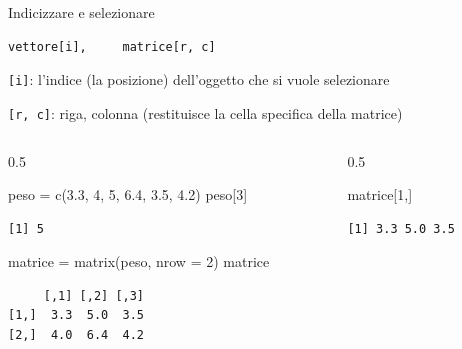 \documentclass[
  ignorenonframetext,
  compress, aspectratio=149]{beamer}
\newenvironment{Shaded}{}{}
\newcommand{\AttributeTok}[1]{\textcolor[rgb]{0.00,0.34,0.68}{#1}}
\newcommand{\DecValTok}[1]{\textcolor[rgb]{0.69,0.50,0.00}{#1}}
\newcommand{\FloatTok}[1]{\textcolor[rgb]{0.69,0.50,0.00}{#1}}
\newcommand{\FunctionTok}[1]{\textcolor[rgb]{0.39,0.29,0.61}{#1}}
\newcommand{\NormalTok}[1]{\textcolor[rgb]{0.12,0.11,0.11}{#1}}
\newcommand{\OtherTok}[1]{\textcolor[rgb]{0.00,0.43,0.16}{#1}}
\begin{document}
\begin{frame}[fragile]{Indicizzare e selezionare}
\begin{verbatim}
vettore[i],     matrice[r, c]
\end{verbatim}

\texttt{{[}i{]}}: l'indice (la posizione) dell'oggetto che si vuole
selezionare

\texttt{{[}r,\ c{]}}: riga, colonna (restituisce la cella specifica
della matrice)

\begin{columns}[T]
\begin{column}{0.5\linewidth}
\small

\begin{Shaded}
\begin{Highlighting}[]
\NormalTok{peso }\OtherTok{=} \FunctionTok{c}\NormalTok{(}\FloatTok{3.3}\NormalTok{, }\DecValTok{4}\NormalTok{, }\DecValTok{5}\NormalTok{, }\FloatTok{6.4}\NormalTok{, }\FloatTok{3.5}\NormalTok{, }\FloatTok{4.2}\NormalTok{)}
\NormalTok{peso[}\DecValTok{3}\NormalTok{]}
\end{Highlighting}
\end{Shaded}

\begin{verbatim}
[1] 5
\end{verbatim}

\begin{Shaded}
\begin{Highlighting}[]
\NormalTok{matrice }\OtherTok{=} \FunctionTok{matrix}\NormalTok{(peso, }\AttributeTok{nrow =} \DecValTok{2}\NormalTok{)}
\NormalTok{matrice}
\end{Highlighting}
\end{Shaded}

\begin{verbatim}
     [,1] [,2] [,3]
[1,]  3.3  5.0  3.5
[2,]  4.0  6.4  4.2
\end{verbatim}
\end{column}

\begin{column}{0.5\linewidth}
\small

\begin{Shaded}
\begin{Highlighting}[]
\NormalTok{matrice[}\DecValTok{1}\NormalTok{,]}
\end{Highlighting}
\end{Shaded}

\begin{verbatim}
[1] 3.3 5.0 3.5
\end{verbatim}


\end{column}
\end{columns}
\end{frame}
\end{document}
